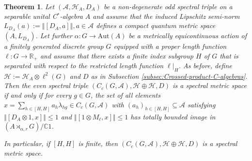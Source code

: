 \documentclass[a4paper,11pt,reqno]{amsart}
\numberwithin{equation}{section}
\numberwithin{equation}{section}
\newtheorem{theorem}{Theorem}[section]
\theoremstyle{definition}
\theoremstyle{remark}
\theoremstyle{remark}
\begin{document}
\begin{theorem} \label{MainTheorem} Let $(\mathcal{A},\mathcal{H}_{A},D_{A})$
be a non-degenerate odd spectral triple on a separable unital C$^{\ast}$-algebra
$A$ and assume that the induced Lipschitz semi-norm $L_{D_{A}}(a):=\left\Vert [D_{A},a]\right\Vert ,a\in\mathcal{A}$
defines a compact quantum metric space $(A,L_{D_{A}})$. Let further
$\alpha:G\rightarrow\text{Aut}(A)$ be a metrically equicontinuous
action of a finitely generated discrete group $G$ equipped with a
proper length function $\ell:G\rightarrow\mathbb{R}_{+}$ and assume
that there exists a finite index subgroup $H$ of $G$ that is separated
with respect to the restricted length function $\ell|_{H}$. As before,
define $\mathcal{H}:=\mathcal{H}_{A}\otimes\ell^{2}(G)$ and $D$
as in Subsection \ref{subsec:Crossed-product-C-algebras}. Then the
even spectral triple $(C_{c}(G,\mathcal{A}),\mathcal{H}\oplus\mathcal{H},D)$
is a spectral metric space if and only if for every $g\in G$,
the set of all elements $x=\sum_{h\in[H,H]}a_{h}\lambda_{hg}\in C_{c}(G,\mathcal{A})$
with $(a_{h})_{h\in[H,H]}\subseteq\mathcal{A}$ satisfying $\left\Vert [D_{A}\otimes1,x]\right\Vert \leq1$
and $\left\Vert [1\otimes M_{\ell},x]\right\Vert \leq1$ has totally
bounded image in $(A\rtimes_{\alpha,r}G)/\mathbb{C}1$.

In particular, if $[H,H]$ is finite, then $(C_{c}(G,\mathcal{A}),\mathcal{H}\oplus\mathcal{H},D)$
is a spectral metric space. \end{theorem}
\end{document}
